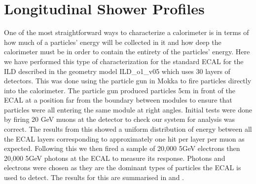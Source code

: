 \section{Longitudinal Shower Profiles}
One of the most straightforward ways to characterize a calorimeter is in terms of how much of a particles' energy will be collected in it and how deep the calorimeter must be in order to contain the entirety of the particles' energy. Here we have performed this type of characterization for the standard ECAL for the ILD described in the geometry model ILD\_o1\_v05 which uses 30 layers of detectors. This was done using the particle gun in Mokka to fire particles directly into the calorimeter. The particle gun produced particles 5cm in front of the ECAL at a position far from the boundary between modules to ensure that particles were all entering the same module at right angles. Initial tests were done by firing 20 GeV muons at the detector to check our system for analysis was correct. The results from this showed a uniform distribution of energy between all the ECAL layers corresponding to approximately one hit per layer per muon as expected. Following this we then fired a sample of 20,000 5GeV electrons then 20,000 5GeV photons at the ECAL to measure its response. Photons and electrons were chosen as they are the dominant types of particles the ECAL is used to detect. The results for this are summarised in  and .


